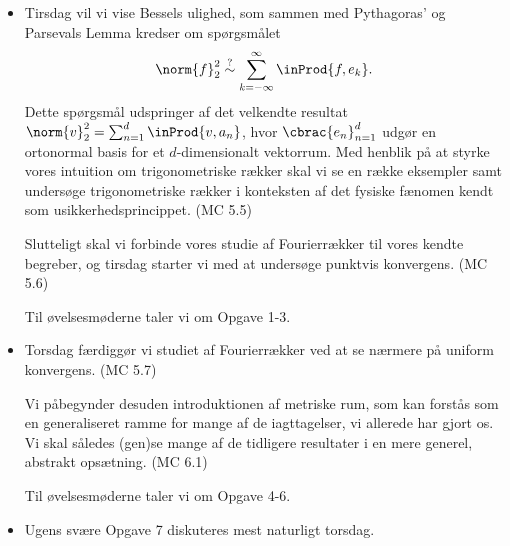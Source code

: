 \begin{itemize}
    \item Tirsdag vil vi vise Bessels ulighed, som sammen med Pythagoras' og Parsevals Lemma kredser om spørgsmålet
    $$ \norm{f}_2^2 \overset{?}{\sim} \sum_{k=-\infty}^\infty \inProd{f,e_k}. $$
    Dette spørgsmål udspringer af det velkendte resultat $\norm{v}_2^2 = \sum_{n=1}^d \inProd{v,a_n}$, hvor $\cbrac{e_n}_{n=1}^d$ udgør en ortonormal basis for et $d$-dimensionalt vektorrum. Med henblik på at styrke vores intuition om trigonometriske rækker skal vi se en række eksempler samt undersøge trigonometriske rækker i konteksten af det fysiske fænomen kendt som usikkerhedsprincippet. (MC 5.5)
    
    Slutteligt skal vi forbinde vores studie af Fourierrækker til vores kendte begreber, og tirsdag starter vi med at undersøge punktvis konvergens. (MC 5.6)
    
    Til øvelsesmøderne taler vi om Opgave 1-3.
    
    \item Torsdag færdiggør vi studiet af Fourierrækker ved at se nærmere på uniform konvergens. (MC 5.7)
    
    Vi påbegynder desuden introduktionen af metriske rum, som kan forstås som en generaliseret ramme for mange af de iagttagelser, vi allerede har gjort os. Vi skal således (gen)se mange af de tidligere resultater i en mere generel, abstrakt opsætning. (MC 6.1)
    
    Til øvelsesmøderne taler vi om Opgave 4-6.
    
    \item Ugens svære Opgave 7 diskuteres mest naturligt torsdag.
\end{itemize}

